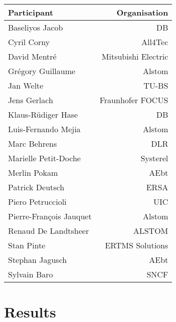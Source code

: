 \documentclass[a4paper]{article}
\begin{document}
\begin{tabular}{|l|r|}
  \hline
\textbf{Participant} & \textbf{Organisation}
\\\hline
Baseliyos Jacob & DB \\
Cyril Corny & All4Tec \\
David Mentr\'{e} & Mitsubishi Electric \\
Gr\'{e}gory Guillaume & Alstom \\
Jan Welte & TU-BS \\
Jens Gerlach & Fraunhofer FOCUS \\
Klaus-R\"{u}diger Hase & DB \\
Luis-Fernando Mejia & Alstom \\ %
Marc Behrens & DLR \\
Marielle Petit-Doche & Systerel \\
Merlin Pokam & AEbt \\
Patrick Deutsch & ERSA \\
Piero Petruccioli & UIC \\
Pierre-Fran\c{c}ois Jauquet & Alstom \\
Renaud De Landtsheer & ALSTOM \\
Stan Pinte & ERTMS Solutions \\
Stephan Jagusch & AEbt \\
Sylvain Baro & SNCF 
\\\hline
\end{tabular}

\renewcommand{\contentsname}{Agenda}
\label{sec:agenda}
\tableofcontents


\section*{Results}

\end{document}

